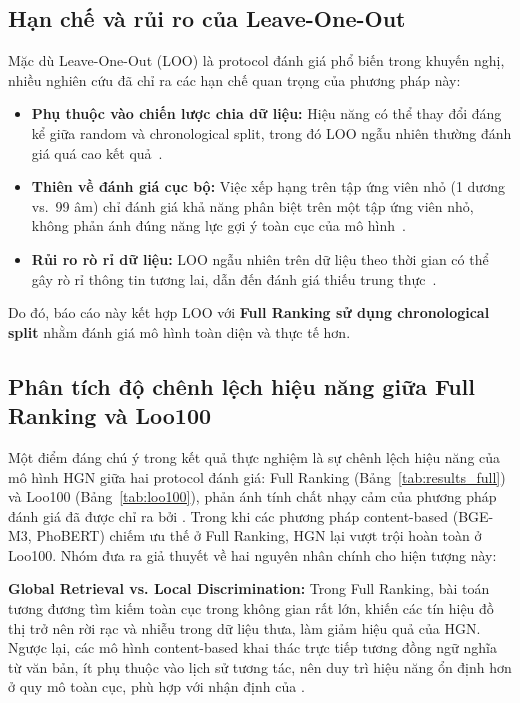 \documentclass[11pt]{article}
\newcommand{\tabref}[1]{Bảng~\ref{#1}}
\begin{document}
\subsection{Hạn chế và rủi ro của Leave-One-Out}
Mặc dù Leave-One-Out (LOO) là protocol đánh giá phổ biến trong khuyến nghị,
nhiều nghiên cứu đã chỉ ra các hạn chế quan trọng của phương pháp này:
\begin{itemize}
    \item \textbf{Phụ thuộc vào chiến lược chia dữ liệu:}
          Hiệu năng có thể thay đổi đáng kể giữa random và chronological split,
          trong đó LOO ngẫu nhiên thường đánh giá quá cao kết quả~\citep{meng2020splitting}.
    \item \textbf{Thiên về đánh giá cục bộ:}
          Việc xếp hạng trên tập ứng viên nhỏ (1 dương vs.\ 99 âm) chỉ đánh giá khả năng phân biệt trên một tập ứng viên nhỏ,
          không phản ánh đúng năng lực gợi ý toàn cục của mô hình~\citep{sun2023evaluation}.

    \item \textbf{Rủi ro rò rỉ dữ liệu:}
          LOO ngẫu nhiên trên dữ liệu theo thời gian có thể gây rò rỉ thông tin tương lai,
          dẫn đến đánh giá thiếu trung thực~\citep{wang2023leakage}.
\end{itemize}
Do đó, báo cáo này kết hợp LOO với \textbf{Full Ranking sử dụng chronological split}
nhằm đánh giá mô hình toàn diện và thực tế hơn.


\subsection{Phân tích độ chênh lệch hiệu năng giữa Full Ranking và Loo100}
Một điểm đáng chú ý trong kết quả thực nghiệm là sự chênh lệch hiệu năng của mô hình HGN giữa hai protocol đánh giá: Full Ranking (\tabref{tab:results_full}) và Loo100 (\tabref{tab:loo100}), phản ánh tính chất nhạy cảm của phương pháp đánh giá đã được chỉ ra bởi \citet{meng2020splitting}. Trong khi các phương pháp content-based (BGE-M3, PhoBERT) chiếm ưu thế ở Full Ranking, HGN lại vượt trội hoàn toàn ở Loo100. Nhóm đưa ra giả thuyết về hai nguyên nhân chính cho hiện tượng này:

\textbf{Global Retrieval vs. Local Discrimination:}
Trong Full Ranking, bài toán tương đương tìm kiếm toàn cục trong không gian rất lớn,
khiến các tín hiệu đồ thị trở nên rời rạc và nhiễu trong dữ liệu thưa,
làm giảm hiệu quả của HGN.
Ngược lại, các mô hình content-based khai thác trực tiếp tương đồng ngữ nghĩa từ văn bản,
ít phụ thuộc vào lịch sử tương tác,
nên duy trì hiệu năng ổn định hơn ở quy mô toàn cục,
phù hợp với nhận định của \citet{sun2023evaluation}.
\end{document}
